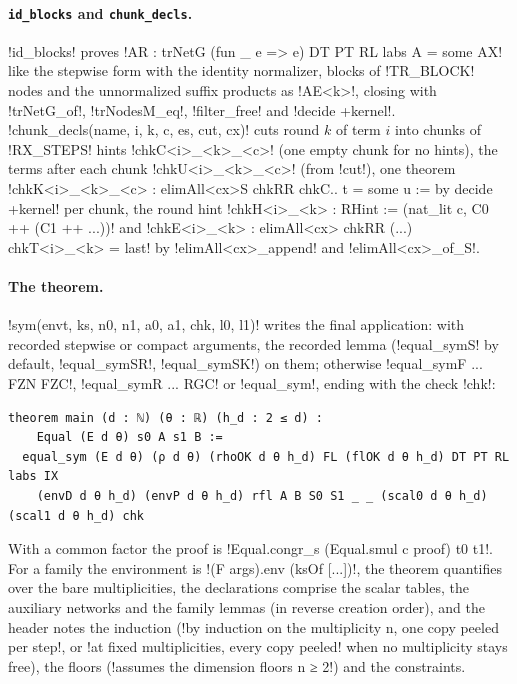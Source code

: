 {{{\paragraph{\texttt{id\_blocks} and \texttt{chunk\_decls}.} \lexpy!id_blocks! proves
\lexlean!AR : trNetG (fun _ e => e) DT PT RL labs A = some AX! like the stepwise form with the
identity normalizer, blocks of \lexpy!TR_BLOCK! nodes and the unnormalized suffix products as
\lexlean!AE<k>!, closing with \lexlean!trNetG_of!, \lexlean!trNodesM_eq!, \lexlean!filter_free! and
\lexlean!decide +kernel!. \lexpy!chunk_decls(name, i, k, c, es, cut, cx)! cuts round $k$ of term $i$
into chunks of \lexpy!RX_STEPS! hints \lexlean!chkC<i>_<k>_<c>! (one empty chunk for no hints), the
terms after each chunk \lexlean!chkU<i>_<k>_<c>! (from \lexpy!cut!), one theorem
\lexlean!chkK<i>_<k>_<c> : elimAll<cx>S chkRR chkC.. t = some u := by decide +kernel! per chunk,
the round hint \lexlean!chkH<i>_<k> : RHint := (nat_lit c, C0 ++ (C1 ++ ...))! and
\lexlean!chkE<i>_<k> : elimAll<cx> chkRR (...) chkT<i>_<k> = last! by \lexlean!elimAll<cx>_append! and
\lexlean!elimAll<cx>_of_S!.

\paragraph{The theorem.} \lexpy!sym(envt, ks, n0, n1, a0, a1, chk, l0, l1)! writes the final
application: with recorded stepwise or compact arguments, the recorded lemma
(\lexlean!equal_symS! by default, \lexlean!equal_symSR!, \lexlean!equal_symSK!) on them; otherwise
\lexlean!equal_symF ... FZN FZC!, \lexlean!equal_symR ... RGC! or \lexlean!equal_sym!, ending with the
check \lexlean!chk!:
\begin{lstlisting}[style=lexlean]
theorem main (d : ℕ) (θ : ℝ) (h_d : 2 ≤ d) :
    Equal (E d θ) s0 A s1 B :=
  equal_sym (E d θ) (ρ d θ) (rhoOK d θ h_d) FL (flOK d θ h_d) DT PT RL labs IX
    (envD d θ h_d) (envP d θ h_d) rfl A B S0 S1 _ _ (scal0 d θ h_d) (scal1 d θ h_d) chk
\end{lstlisting}
With a common factor the proof is \lexlean!Equal.congr_s (Equal.smul c proof) t0 t1!. For a family
the environment is \lexlean!(F args).env (ksOf [...])!, the theorem quantifies over the bare
multiplicities, the declarations comprise the scalar tables, the auxiliary networks and the
family lemmas (in reverse creation order), and the header notes the induction
(\lexcode!by induction on the multiplicity n, one copy peeled per step!, or
\lexcode!at fixed multiplicities, every copy peeled! when no multiplicity stays free), the floors
(\lexcode!assumes the dimension floors n ≥ 2!) and the constraints.

}}}
